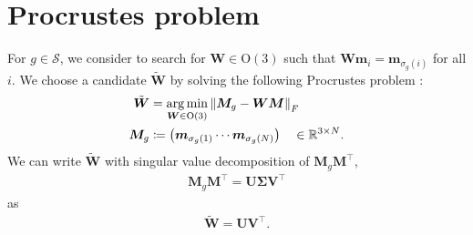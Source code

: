 \section{\label{appx:procrustes}Procrustes problem}

For $g \in \mathcal{S}$, we consider to search for $\bm{W} \in \mathrm{O}(3)$ such that $\bm{W} \bm{m}_{i} = \bm{m}_{\sigma_{g}(i)}$ for all $i$.
We choose a candidate $\tilde{\bm{W}}$ by solving the following Procrustes problem \cite{10.1093/acprof:oso/9780198510581.001.0001}:
\begin{align}
  \tilde{\bm{W}}
    &=\operatorname*{arg\,min}_{ \bm{W} \in \mathrm{O}(3) } \left\lVert \bm{M}_{g} - \bm{W} \bm{M} \right\rVert_{F} \\
  \bm{M}_{g}
    &\coloneqq \left( \bm{m}_{\sigma_{g}(1)} \cdots \bm{m}_{\sigma_{g}(N)} \right)
    \quad \in \mathbb{R}^{3 \times N}.
\end{align}
We can write $\tilde{\bm{W}}$ with singular value decomposition of $\bm{M}_{g} \bm{M}^{\top}$,
\begin{align}
  \bm{M}_{g} \bm{M}^{\top}
    = \bm{U} \bm{\Sigma} \bm{V}^{\top}
\end{align}
as
\begin{align}
  \tilde{\bm{W}} = \bm{U} \bm{V}^{\top}.
\end{align}
